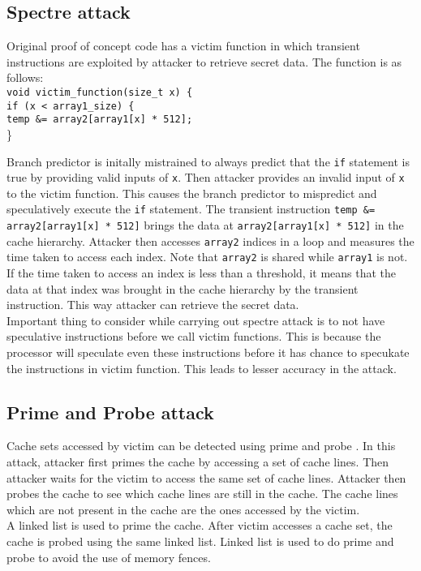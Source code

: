 \subsection{Spectre attack}

Original proof of concept code has a victim function in which transient instructions are exploited by attacker to retrieve secret data. The function is as follows: \\
\texttt{void victim\_function(size\_t x) \{ }\\
\indent  \texttt{if (x < array1\_size) \{} \\
\indent	\indent	\texttt{temp \&= array2[array1[x] * 512];} \\
\} 

\indent Branch predictor is initally mistrained to always predict that the \texttt{if} statement is true by providing valid inputs of \texttt{x}. Then attacker provides an invalid input of \texttt{x} to the victim function. This causes the branch predictor to mispredict and speculatively execute the \texttt{if} statement. The transient instruction \texttt{temp \&= array2[array1[x] * 512]} brings the data at \texttt{array2[array1[x] * 512]} in the cache hierarchy. Attacker then accesses \texttt{array2} indices in a loop and measures the time taken to access each index. Note that \texttt{array2} is shared while \texttt{array1} is not. If the time taken to access an index is less than a threshold, it means that the data at that index was brought in the cache hierarchy by the transient instruction. This way attacker can retrieve the secret data. \\
\indent Important thing to consider while carrying out spectre attack is to not have speculative instructions before we call victim functions. This is because the processor will speculate even these instructions before it has chance to specukate the instructions in victim function. This leads to lesser accuracy in the attack.
\subsection{Prime and Probe attack}
Cache sets accessed by victim can be detected using prime and probe \cite{primeprobe}. In this attack, attacker first primes the cache by accessing a set of cache lines. Then attacker waits for the victim to access the same set of cache lines. Attacker then probes the cache to see which cache lines are still in the cache. The cache lines which are not present in the cache are the ones accessed by the victim. \\
\indent A linked list is used to prime the cache. After victim accesses a cache set, the cache is probed using the same linked list. Linked list is used to do prime and probe to avoid the use of memory fences.